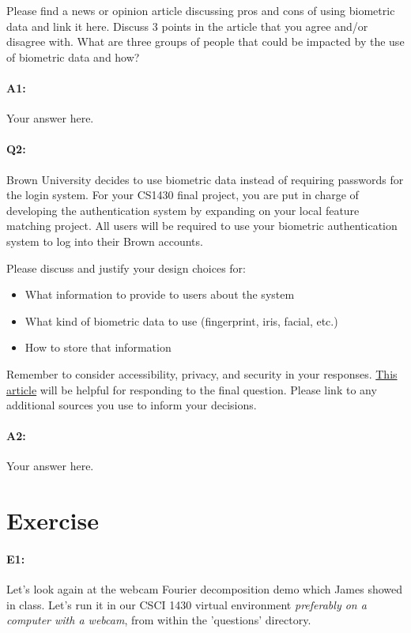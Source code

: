 Please find a news or opinion article discussing pros and cons of using biometric data and link it here. Discuss 3 points in the article that you agree and/or disagree with. What are three groups of people that could be impacted by the use of biometric data and how? 

\paragraph{A1:} Your answer here.
\pagebreak

\paragraph{Q2:} Brown University decides to use biometric data instead of requiring passwords for the login system. For your CS1430 final project, you are put in charge of developing the authentication system by expanding on your local feature matching project. All users will be required to use your biometric authentication system to log into their Brown accounts. 

Please discuss and justify your design choices for: 
\begin{itemize}
	\item What information to provide to users about the system
	\item What kind of biometric data to use (fingerprint, iris, facial, etc.)
	\item How to store that information 
\end{itemize}
Remember to consider accessibility, privacy, and security in your responses. \href{https://ievoreader.com/how-biometric-data-is-stored/}{This article} will be helpful for responding to the final question. Please link to any additional sources you use to inform your decisions.

\paragraph{A2:} Your answer here.
\pagebreak

\section*{Exercise}

\paragraph{E1:} Let's look again at the webcam Fourier decomposition demo which James showed in class. Let's run it in our CSCI 1430 virtual environment \emph{preferably on a computer with a webcam}, from within the 'questions' directory.

